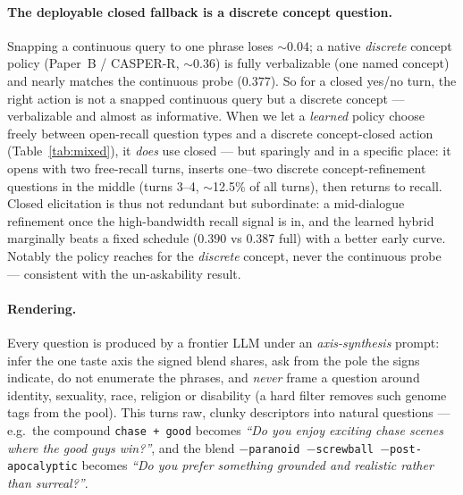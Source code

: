 \documentclass[11pt]{article}
\begin{document}
\paragraph{The deployable closed fallback is a discrete concept question.} Snapping a continuous query to one phrase
loses $\sim\!0.04$; a native \emph{discrete} concept policy (Paper~B / CASPER-R, $\sim0.36$) is fully verbalizable
(one named concept) and nearly matches the continuous probe ($0.377$). So for a closed yes/no turn, the right action
is not a snapped continuous query but a discrete concept --- verbalizable and almost as informative. When we let a
\emph{learned} policy choose freely between open-recall question types and a discrete concept-closed action
(Table~\ref{tab:mixed}), it \emph{does} use closed --- but sparingly and in a specific place: it opens with two
free-recall turns, inserts one--two discrete concept-refinement questions in the middle (turns 3--4, $\sim$12.5\% of
all turns), then returns to recall. Closed elicitation is thus not redundant but subordinate: a mid-dialogue
refinement once the high-bandwidth recall signal is in, and the learned hybrid marginally beats a fixed schedule
($0.390$ vs $0.387$ full) with a better early curve. Notably the policy reaches for the \emph{discrete} concept, never
the continuous probe --- consistent with the un-askability result.

\paragraph{Rendering.} Every question is produced by a frontier LLM under an \emph{axis-synthesis} prompt: infer the
one taste axis the signed blend shares, ask from the pole the signs indicate, do not enumerate the phrases, and
\emph{never} frame a question around identity, sexuality, race, religion or disability (a hard filter removes such
genome tags from the pool). This turns raw, clunky descriptors into natural questions --- e.g.\ the compound
\texttt{chase\,+\,good} becomes \emph{``Do you enjoy exciting chase scenes where the good guys win?''}, and the blend
\texttt{$-$paranoid $-$screwball $-$post-apocalyptic} becomes \emph{``Do you prefer something grounded and realistic
rather than surreal?''}.
\end{document}
